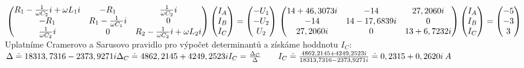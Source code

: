 \begin{math}
\newline
\begin{pmatrix}
R_1-\frac{1}{\omega C_2}i+\omega L_1i & -R_1 & \frac{1}{\omega C_2}i\\
-R_1 & R_1 - \frac{1}{\omega C_1}i & 0\\
\frac{1}{\omega C_2}i & 0 & R_2-\frac{1}{\omega C_2}i+\omega L_2i
\end{pmatrix}
\begin{pmatrix}
I_A\\
I_B\\
I_C
\end{pmatrix}
=
\begin{pmatrix}
-U_1\\
-U_2\\
U_2
\end{pmatrix}\\ \\
\newline
\begin{pmatrix}
14+46,3073i & -14 & 27,2060i\\
-14 & 14-17,6839i & 0\\
27,2060i & 0 & 13+6,7232i
\end{pmatrix}
\begin{pmatrix}
I_A\\
I_B\\
I_C
\end{pmatrix}
=
\begin{pmatrix}
-5\\
-3\\
3
\end{pmatrix}\\ \\
\newline
\end{math}
\Large{Uplatníme Cramerovo a Sarusovo pravidlo pro výpočet determinantů a získáme hoddnotu \(I_C\):}\\ 
\begin{math}
\newline
\Delta \doteq  18313,7316 - 2373,9271i\\
\Delta_C \doteq 4862,2145 + 4249,2523i\\ \\
I_C = \frac{\Delta_C}{\Delta}\quad \quad I_C \doteq \frac{4862,2145 + 4249,2523i}{18313,7316 - 2373,9271i} \doteq 0,2315+0,2620i\:A\\ \\
\end{math}
